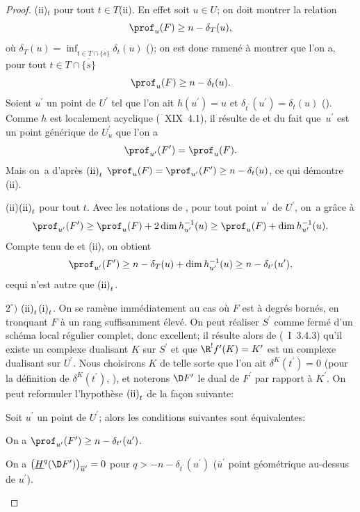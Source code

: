 \begin{proof}
\textup{(ii)}$_{t}$ pour tout $t\in T$\ALORS\textup{(ii)}. En effet soit $u\in U$; on doit montrer la relation
$$
\prof_{u}(F)\geq n-\delta_{T}(u),
$$
o\`u $\delta_{T}(u)=\inf_{t\in T\cap\overline{\{ s\} }}\delta_{t}(u)$ (\cf {}); on est donc ramen\'e \`a montrer que l'on a, pour tout $t\in T\cap\overline{\{ s\} }$
$$
\prof_{u}(F)\geq n-\delta_{t}(u).
$$
Soient $u^{\prime}$ un point de $U^{\prime}$ tel que l'on ait $h(u^{\prime})=u$ et $\delta_{t^{\prime}}(u^{\prime})=\delta_{t}(u)$ (\cf {}). Comme $h$ est localement acyclique (~XIX~4.1), il r\'esulte de  et du fait que~$u^{\prime}$ est un point g\'en\'erique de $U_{u}^{\prime}$ que l'on a
$$
\prof_{u^{\prime}}(F^{\prime})=\prof_{u}(F).
$$
Mais on~a d'apr\`es $\textup{(ii)}_{t}$ $\prof_{u}(F)=\prof_{u^{\prime}}(F^{\prime})\geq n-\delta_{t}(u)$, ce qui d\'emontre \textup{(ii)}.

\textup{(ii)}\ALORS$\textup{(ii)}_{t}$ pour tout $t$. Avec les notations de , pour tout point $u^{\prime}$ de $U^{\prime}$, on~a gr\^ace \`a 
$$
\prof_{u^{\prime}}(F^{\prime})\geq\prof_{u}(F)+2\dim h_{u^{\prime}}^{-1}(u)\geq\prof_{u}(F)+\dim h_{u^{\prime}}^{-1}(u).
$$
Compte tenu de  et \textup{(ii)}, on obtient
$$
\prof_{u^{\prime}}(F^{\prime})\geq n-\delta_{T}(u)+\dim h_{u^{\prime}}^{-1}(u)\geq n-\delta_{t^{\prime}}(u^{\prime}),
$$
ce\pageoriginaled qui n'est autre que $\textup{(ii)}_{t}$.

$2^\circ)$ $\textup{(ii)}_{t}$\SSI$\textup{(i)}_{t}$. On se ram\`ene imm\'ediatement au cas o\`u $F$ est \`a degr\'es born\'es, en tronquant $F$ \`a un rang suffisamment \'elev\'e. On peut r\'ealiser $S^{\prime}$ comme ferm\'e d'un sch\'ema local r\'egulier complet, donc excellent; il r\'esulte alors de (~I~3.4.3) qu'il existe un complexe dualisant $K$ sur $S^{\prime}$ et que $\R^{!}f^{\prime}(K)=K^{\prime}$ est un complexe dualisant sur $U^{\prime}$. Nous choisirons $K$ de telle sorte que l'on ait $\delta^{K}(t^{\prime})=0$ (pour la d\'efinition de $\delta^{K}(t^{\prime})$, \cf {}), et noterons $\D F^{\prime}$ le dual de $F^{\prime}$ par rapport \`a $K^{\prime}$. On peut reformuler l'hypoth\`ese $\textup{(ii)}_{t}$ de la fa\c con suivante:

\begin{sublemme} \label{XIV.4.2.2}
Soit $u^{\prime}$ un point de $U^{\prime}$; alors les conditions suivantes sont \'equivalentes:
\begin{enumeratei}
\item
On a $\prof_{u^{\prime}}(F^{\prime})\geq n-\delta_{t^{\prime}}(u^{\prime})$.
\item
On a $\big(\underline{H}^{q}(\D F^{\prime}) \big)_{\overline{u}^{\prime}}=0$ pour $q>-n-\delta_{t^{\prime}}(u^{\prime})$ ($\overline{u}^{\prime}$ point g\'eom\'etrique au-dessus de $u^{\prime}$).
\end{enumeratei}
\end{sublemme}


\end{proof}

